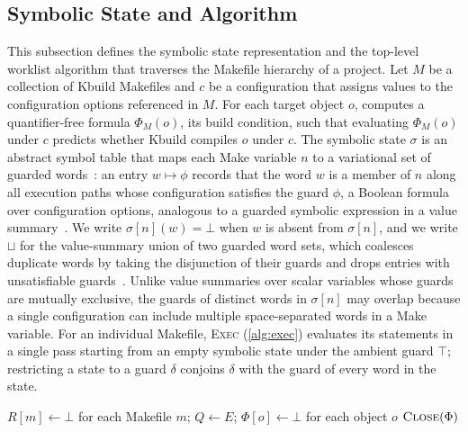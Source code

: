 \documentclass[acmsmall,screen,review,anonymous,nonacm]{acmart}
\begin{document}
  \subsection{Symbolic State and Algorithm}
    \label{sec:approach:state}
    This subsection defines the symbolic state representation and the top-level worklist algorithm that traverses the Makefile hierarchy of a project.
    Let $M$ be a collection of Kbuild Makefiles and $c$ be a configuration that assigns values to the configuration options referenced in $M$.
    For each target object $o$, \tool{} computes a quantifier-free formula $\Phi_M(o)$, its build condition, such that evaluating $\Phi_M(o)$ under $c$ predicts whether Kbuild compiles $o$ under $c$.
    The symbolic state $\sigma$ is an abstract symbol table that maps each Make variable $n$ to a variational set of guarded words~\cite{walkingshaw2014variational}: an entry $w \mapsto \phi$ records that the word $w$ is a member of $n$ along all execution paths whose configuration satisfies the guard $\phi$, a Boolean formula over configuration options, analogous to a guarded symbolic expression in a value summary~\cite{sen2015multise}.
    We write $\sigma[n](w) = \bot$ when $w$ is absent from $\sigma[n]$, and we write $\sqcup$ for the value-summary union of two guarded word sets, which coalesces duplicate words by taking the disjunction of their guards and drops entries with unsatisfiable guards~\cite{sen2015multise}.
    Unlike value summaries over scalar variables whose guards are mutually exclusive, the guards of distinct words in $\sigma[n]$ may overlap because a single configuration can include multiple space-separated words in a Make variable.
    For an individual Makefile, \textsc{Exec} (\autoref{alg:exec}) evaluates its statements in a single pass starting from an empty symbolic state under the ambient guard $\top$; restricting a state to a guard $\delta$ conjoins $\delta$ with the guard of every word in the state.

    \begin{algorithm}[t]
    \caption{Build conditions of the objects of a source tree}\label{alg:extract}
    $R[m] \gets \bot$ for each Makefile $m$; $Q \gets E$; $\Phi[o] \gets \bot$ for each object $o$\;
    \Return $\textsc{Close}(\Phi)$\label{line:close}
    \end{algorithm}
\end{document}

